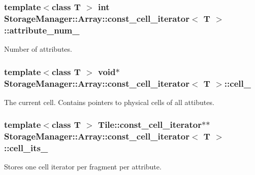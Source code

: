 \subsubsection[{attribute\+\_\+num\+\_\+}]{\setlength{\rightskip}{0pt plus 5cm}template$<$class T $>$ int {\bf Storage\+Manager\+::\+Array\+::const\+\_\+cell\+\_\+iterator}$<$ T $>$\+::attribute\+\_\+num\+\_\+\hspace{0.3cm}{\ttfamily [private]}}\label{classStorageManager_1_1Array_1_1const__cell__iterator_a42078a9fb956c03a3ea3c6842addf5a7}
Number of attributes. \hypertarget{classStorageManager_1_1Array_1_1const__cell__iterator_ac0664d62642d1820e16472737f774aa3}{}
\subsubsection[{cell\+\_\+}]{\setlength{\rightskip}{0pt plus 5cm}template$<$class T $>$ void$\ast$ {\bf Storage\+Manager\+::\+Array\+::const\+\_\+cell\+\_\+iterator}$<$ T $>$\+::cell\+\_\+\hspace{0.3cm}{\ttfamily [private]}}\label{classStorageManager_1_1Array_1_1const__cell__iterator_ac0664d62642d1820e16472737f774aa3}
The current cell. Contains pointers to physical cells of all attibutes. \hypertarget{classStorageManager_1_1Array_1_1const__cell__iterator_a0228a45b393260191faf74ab8de97e59}{}
\subsubsection[{cell\+\_\+its\+\_\+}]{\setlength{\rightskip}{0pt plus 5cm}template$<$class T $>$ {\bf Tile\+::const\+\_\+cell\+\_\+iterator}$\ast$$\ast$ {\bf Storage\+Manager\+::\+Array\+::const\+\_\+cell\+\_\+iterator}$<$ T $>$\+::cell\+\_\+its\+\_\+\hspace{0.3cm}{\ttfamily [private]}}\label{classStorageManager_1_1Array_1_1const__cell__iterator_a0228a45b393260191faf74ab8de97e59}
Stores one cell iterator per fragment per attribute. \hypertarget{classStorageManager_1_1Array_1_1const__cell__iterator_afc2fc05f7c8c7eee43136fb7d2a4450b}{}
